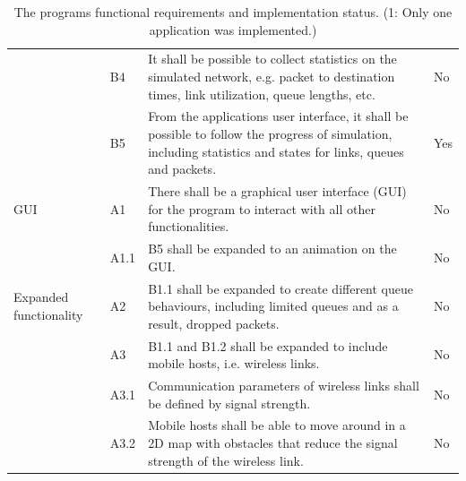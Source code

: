 \begin{table}[!htbp]
{\begin{tabular}{p{}|p{}|p{}|p{}}
& B4        & It shall be possible to collect statistics on the simulated network, e.g. packet to destination times, link utilization, queue lengths, etc. & No\\
& B5        & From the applications user interface, it shall be possible to follow the progress of simulation, including statistics and states for links, queues and packets. & Yes \\
\hline GUI
& A1        & There shall be a graphical user interface (GUI) for the program to interact with all other functionalities. & No\\
& A1.1      & B5 shall be expanded to an animation on the GUI. & No\\
\hline Expanded functionality
& A2        & B1.1 shall be expanded to create different queue behaviours, including limited queues and as a result, dropped packets. & No\\
& A3        & B1.1 and B1.2 shall be expanded to include mobile hosts, i.e. wireless links. & No\\
& A3.1      & Communication parameters of wireless links shall be defined by signal strength. & No\\
& A3.2      & Mobile hosts shall be able to move around in a 2D map with obstacles that reduce the signal strength of the wireless link. & No\\
\hline
\end{tabular}
}
\caption{The programs functional requirements and implementation status. (1: Only one application was implemented.) }
\label{table:requirements}
\end{table}

